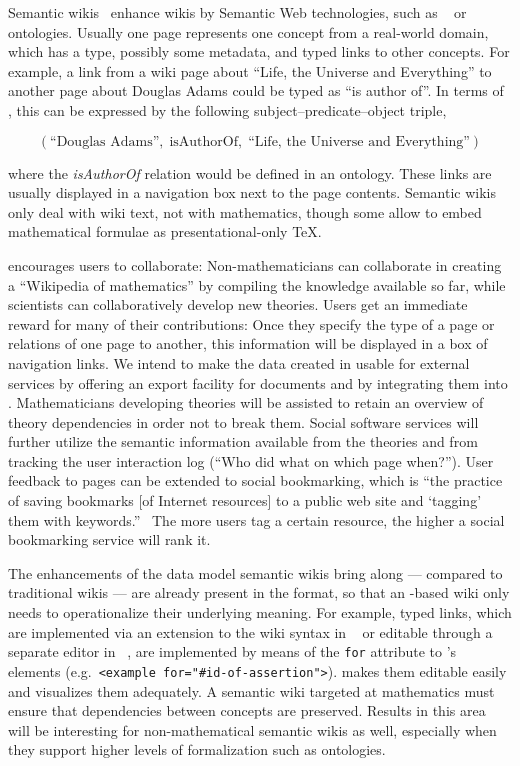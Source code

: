 Semantic
wikis~\cite{voelkel06:semanticwikistateoftheart,TolPas06:wikis-semantic-hypermedia}
enhance wikis by Semantic Web technologies, such as {\rdf}~\cite{LasSwi:rdf99} or
ontologies.  Usually one page represents one concept from a real-world domain, which has a
type, possibly some metadata, and typed links to other concepts.  For example, a link from
a wiki page about ``Life, the Universe and Everything'' to another page about Douglas
Adams could be typed as ``is author of''.  In terms of {\rdf}, this can be expressed by the
following subject--predicate--object triple,

\[
(\mbox{``Douglas Adams''},\;\mbox{isAuthorOf},\;\mbox{``Life, the Universe and
Everything''})
\]

where the \textit{isAuthorOf} relation would be defined in an ontology.  These links are
usually displayed in a navigation box next to the page contents. Semantic wikis only deal
with wiki text, not with mathematics, though some allow to embed mathematical formulae as
presentational-only {\TeX}.

{\swim} encourages users to collaborate: Non-mathematicians can collaborate in creating a
``Wikipedia of mathematics'' by compiling the knowledge available so far, while scientists
can collaboratively develop new theories.  Users get an immediate reward for many of their
contributions: Once they specify the type of a page or relations of one page to another,
this information will be displayed in a box of navigation links.  We intend to make the
data created in {\swim} usable for external services by offering an export facility for
{\omdoc} documents and by integrating them into {\swim}.  Mathematicians developing
theories will be assisted to retain an overview of theory dependencies in order not to
break them.  Social software services will further utilize the semantic information
available from the theories and from tracking the user interaction log (``Who did what on
which page when?'').  User feedback to pages can be extended to social bookmarking, which
is ``the practice of saving bookmarks [of Internet resources] to a public web site and
`tagging' them with keywords.''~\cite{lomas05:social-bookmarking} The more users tag a
certain resource, the higher a social bookmarking service will rank it.

The enhancements of the data model semantic wikis bring along --- compared to traditional
wikis --- are already present in the {\omdoc} format, so that an {\omdoc}-based wiki only
needs to operationalize their underlying meaning. For example, typed links, which are
implemented via an extension to the wiki syntax in ~\cite{voelkel06:semanticwikipedia} or editable through a separate editor in
~\cite{schaffert06:ikewiki}, are implemented by means of the \texttt{for}
attribute to {\omdoc}'s elements (e.g.\ \texttt{<example for="\#id-of-assertion">}).
{\swim} makes them editable easily and visualizes them adequately.  A semantic wiki
targeted at mathematics must ensure that dependencies between concepts are preserved.
Results in this area will be interesting for non-mathematical semantic wikis as well,
especially when they support higher levels of formalization such as ontologies.

